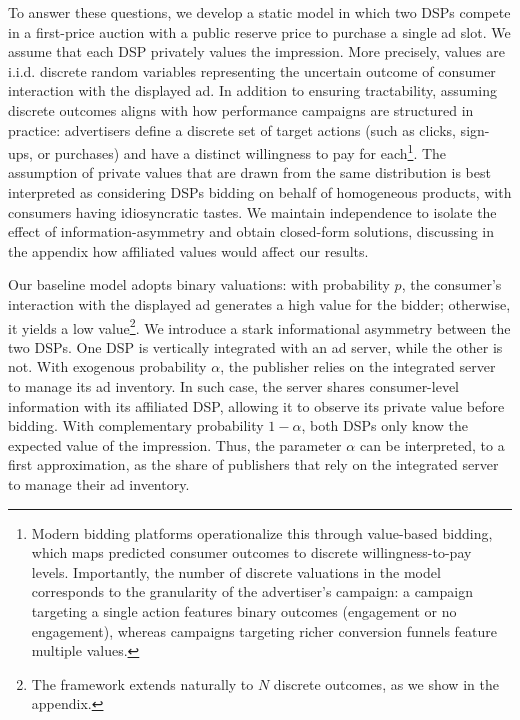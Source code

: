 \documentclass[11pt]{article}
\theoremstyle{plain}
\theoremstyle{definition}
\theoremstyle{plain}
\theoremstyle{plain}
\theoremstyle{plain}
\theoremstyle{plain}
\numberwithin{equation}{section}
\begin{document}
To answer these questions, we develop a static model in which two DSPs compete in a first-price auction with a public reserve price to purchase a single ad slot. We assume that each DSP privately values the impression. More precisely, values are i.i.d. discrete random variables representing the uncertain outcome of consumer interaction with the displayed ad. In addition to ensuring tractability, assuming discrete outcomes aligns with how performance campaigns are structured in practice: advertisers define a discrete set of target actions (such as clicks, sign-ups, or purchases) and have a distinct willingness to pay for each\footnote{Modern bidding platforms operationalize this through value-based bidding, which maps predicted consumer outcomes to discrete willingness-to-pay levels. Importantly, the number of discrete valuations in the model corresponds to the granularity of the advertiser's campaign: a campaign targeting a single action features binary outcomes (engagement or no engagement), whereas campaigns targeting richer conversion funnels feature multiple values.}. The assumption of private values that are drawn from the same distribution is best interpreted as considering DSPs bidding on behalf of homogeneous products, with consumers having idiosyncratic tastes. We maintain independence to isolate the effect of information-asymmetry and obtain closed-form solutions, discussing in the appendix how affiliated values would affect our results.

Our baseline model adopts binary valuations: with probability $ p $, the consumer's interaction with the displayed ad generates a high value for the bidder; otherwise, it yields a low value\footnote{The framework extends naturally to $ N $ discrete outcomes, as we show in the appendix.}. We introduce a stark informational asymmetry between the two DSPs. One DSP is vertically integrated with an ad server, while the other is not. With exogenous probability $ \alpha $, the publisher relies on the integrated server to manage its ad inventory. In such case, the server shares consumer-level information with its affiliated DSP, allowing it to observe its private value before bidding. With complementary probability $ 1-\alpha $, both DSPs only know the expected value of the impression. Thus, the parameter $ \alpha $ can be interpreted, to a first approximation, as the share of publishers that rely on the integrated server to manage their ad inventory.
\end{document}

